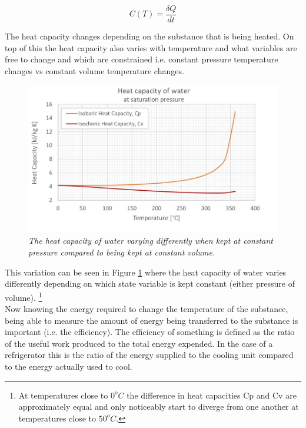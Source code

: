\documentclass[10pt]{article}
\begin{document}
\begin{equation}\label{eq:heat_cap}
    C(T) = \frac{\delta Q}{dt}
\end{equation}

The heat capacity changes depending on the substance that is being heated. On top of this the heat capacity also varies with temperature and what variables are free to change and which are constrained i.e. constant pressure temperature changes vs constant volume temperature changes.\\

\begin{figure}[h!]
    \centering
    \includegraphics[scale=.75]{Heat_capacity_C.jpg}
    \caption{\it{The heat capacity of water varying differently when kept at constant pressure compared to being kept at constant volume\cite{heat_cap}.}}
    \label{fig:heat_cap_water}
\end{figure}

This variation can be seen in Figure \ref{fig:heat_cap_water} where the heat capacity of water varies differently depending on which state variable is kept constant (either pressure of volume). \footnote{At temperatures close to $0^oC$ the difference in heat capacities Cp and Cv are approximately equal and only noticeably start to diverge from one another at temperatures close to $50^oC$.}\\

Now knowing the energy required to change the temperature of the substance, being able to measure the amount of energy being transferred to the substance is important (i.e. the efficiency). The efficiency of something is defined as the ratio of the useful work produced to the total energy expended. In the case of a refrigerator this is the ratio of the energy supplied to the cooling unit compared to the energy actually used to cool.\\
\end{document}
